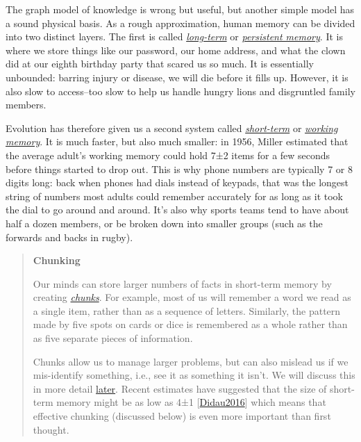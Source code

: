 \documentclass[10pt,statementpaper]{memoir}
\begin{document}
The graph model of knowledge is wrong but useful, but another simple
model has a sound physical basis. As a rough approximation, human memory
can be divided into two distinct layers. The first is called
\emph{\href{gloss.html\#long-term-memory}{long-term}} or
\emph{\href{gloss.html\#persistent-memory}{persistent memory}}. It is
where we store things like our password, our home address, and what the
clown did at our eighth birthday party that scared us so much. It is
essentially unbounded: barring injury or disease, we will die before it
fills up. However, it is also slow to access--too slow to help us handle
hungry lions and disgruntled family members.

Evolution has therefore given us a second system called
\emph{\href{gloss.html\#short-term-memory}{short-term}} or
\emph{\href{gloss.html\#working-memory}{working memory}}. It is much
faster, but also much smaller: in 1956, Miller estimated that the
average adult's working memory could hold 7±2 items for a few seconds
before things started to drop out. This is why phone numbers are
typically 7 or 8 digits long: back when phones had dials instead of
keypads, that was the longest string of numbers most adults could
remember accurately for as long as it took the dial to go around and
around. It's also why sports teams tend to have about half a dozen
members, or be broken down into smaller groups (such as the forwards and
backs in rugby).

\newpage

\begin{quote}
\textbf{Chunking}

Our minds can store larger numbers of facts in short-term memory by
creating \emph{\href{gloss.html\#chunking}{chunks}}. For example, most
of us will remember a word we read as a single item, rather than as a
sequence of letters. Similarly, the pattern made by five spots on cards
or dice is remembered as a whole rather than as five separate pieces of
information.

Chunks allow us to manage larger problems, but can also mislead us if we
mis-identify something, i.e., see it as something it isn't. We will
discuss this in more detail
\href{load.html\#pattern-recognition}{later}. Recent estimates have
suggested that the size of short-term memory might be as low as 4±1
{[}\href{biblio.html\#didau-teachers-psych}{Didau2016}{]} which means
that effective chunking (discussed below) is even more important than
first thought.
\end{quote}
\end{document}
